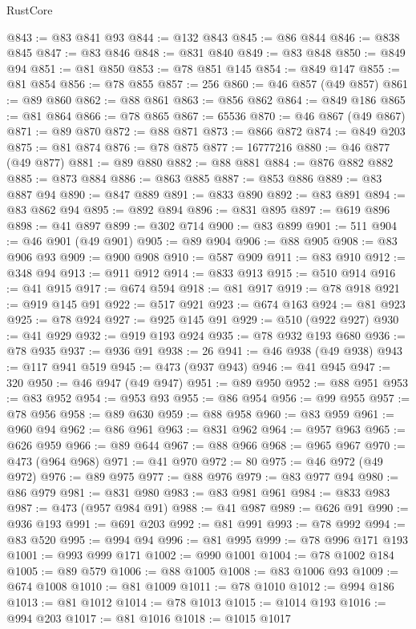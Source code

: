 \begin{lexlean}{RustCore}
\begin{coremodule}
@843 := @83 @841 @93
@844 := @132 @843
@845 := @86 @844
@846 := @838 @845
@847 := @83 @846
@848 := @831 @840
@849 := @83 @848
@850 := @849 @94
@851 := @81 @850
@853 := @78 @851 @145
@854 := @849 @147
@855 := @81 @854
@856 := @78 @855
@857 := 256
@860 := @46 @857 (@49 @857)
@861 := @89 @860
@862 := @88 @861
@863 := @856 @862
@864 := @849 @186
@865 := @81 @864
@866 := @78 @865
@867 := 65536
@870 := @46 @867 (@49 @867)
@871 := @89 @870
@872 := @88 @871
@873 := @866 @872
@874 := @849 @203
@875 := @81 @874
@876 := @78 @875
@877 := 16777216
@880 := @46 @877 (@49 @877)
@881 := @89 @880
@882 := @88 @881
@884 := @876 @882 @882
@885 := @873 @884
@886 := @863 @885
@887 := @853 @886
@889 := @83 @887 @94
@890 := @847 @889
@891 := @833 @890
@892 := @83 @891
@894 := @83 @862 @94
@895 := @892 @894
@896 := @831 @895
@897 := @619 @896
@898 := @41 @897
@899 := @302 @714
@900 := @83 @899
@901 := 511
@904 := @46 @901 (@49 @901)
@905 := @89 @904
@906 := @88 @905
@908 := @83 @906 @93
@909 := @900 @908
@910 := @587 @909
@911 := @83 @910
@912 := @348 @94
@913 := @911 @912
@914 := @833 @913
@915 := @510 @914
@916 := @41 @915
@917 := @674 @594
@918 := @81 @917
@919 := @78 @918
@921 := @919 @145 @91
@922 := @517 @921
@923 := @674 @163
@924 := @81 @923
@925 := @78 @924
@927 := @925 @145 @91
@929 := @510 (@922 @927)
@930 := @41 @929
@932 := @919 @193 @924
@935 := @78 @932 @193 @680
@936 := @78 @935
@937 := @936 @91
@938 := 26
@941 := @46 @938 (@49 @938)
@943 := @117 @941 @519
@945 := @473 (@937 @943)
@946 := @41 @945
@947 := 320
@950 := @46 @947 (@49 @947)
@951 := @89 @950
@952 := @88 @951
@953 := @83 @952
@954 := @953 @93
@955 := @86 @954
@956 := @99 @955
@957 := @78 @956
@958 := @89 @630
@959 := @88 @958
@960 := @83 @959
@961 := @960 @94
@962 := @86 @961
@963 := @831 @962
@964 := @957 @963
@965 := @626 @959
@966 := @89 @644
@967 := @88 @966
@968 := @965 @967
@970 := @473 (@964 @968)
@971 := @41 @970
@972 := 80
@975 := @46 @972 (@49 @972)
@976 := @89 @975
@977 := @88 @976
@979 := @83 @977 @94
@980 := @86 @979
@981 := @831 @980
@983 := @83 @981 @961
@984 := @833 @983
@987 := @473 (@957 @984 @91)
@988 := @41 @987
@989 := @626 @91
@990 := @936 @193
@991 := @691 @203
@992 := @81 @991
@993 := @78 @992
@994 := @83 @520
@995 := @994 @94
@996 := @81 @995
@999 := @78 @996 @171 @193
@1001 := @993 @999 @171
@1002 := @990 @1001
@1004 := @78 @1002 @184
@1005 := @89 @579
@1006 := @88 @1005
@1008 := @83 @1006 @93
@1009 := @674 @1008
@1010 := @81 @1009
@1011 := @78 @1010
@1012 := @994 @186
@1013 := @81 @1012
@1014 := @78 @1013
@1015 := @1014 @193
@1016 := @994 @203
@1017 := @81 @1016
@1018 := @1015 @1017

\end{coremodule}
\end{lexlean}
